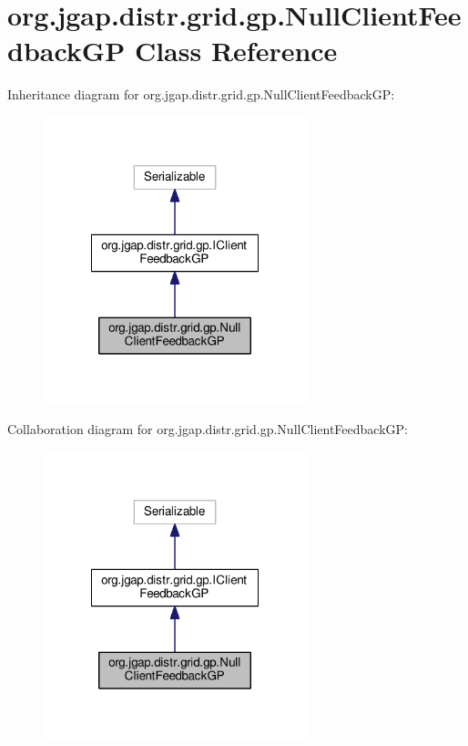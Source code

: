 \hypertarget{classorg_1_1jgap_1_1distr_1_1grid_1_1gp_1_1_null_client_feedback_g_p}{\section{org.\-jgap.\-distr.\-grid.\-gp.\-Null\-Client\-Feedback\-G\-P Class Reference}
\label{classorg_1_1jgap_1_1distr_1_1grid_1_1gp_1_1_null_client_feedback_g_p}
}


Inheritance diagram for org.\-jgap.\-distr.\-grid.\-gp.\-Null\-Client\-Feedback\-G\-P\-:
\nopagebreak
\begin{figure}[H]
\begin{center}
\leavevmode
\includegraphics[width=216pt]{classorg_1_1jgap_1_1distr_1_1grid_1_1gp_1_1_null_client_feedback_g_p__inherit__graph}
\end{center}
\end{figure}


Collaboration diagram for org.\-jgap.\-distr.\-grid.\-gp.\-Null\-Client\-Feedback\-G\-P\-:
\nopagebreak
\begin{figure}[H]
\begin{center}
\leavevmode
\includegraphics[width=216pt]{classorg_1_1jgap_1_1distr_1_1grid_1_1gp_1_1_null_client_feedback_g_p__coll__graph}
\end{center}
\end{figure}
